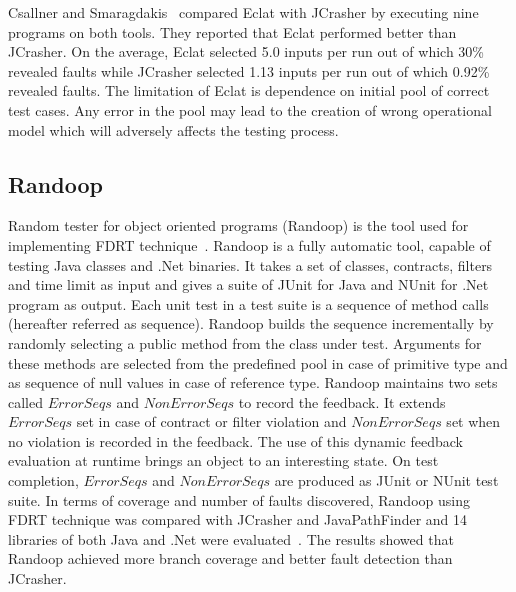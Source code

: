 Csallner and Smaragdakis~\cite{csallner2004jcrasher} compared Eclat with JCrasher by executing nine programs on  both tools. They reported that Eclat performed better than JCrasher. On the average, Eclat selected 5.0 inputs per run out of which 30\% revealed faults while JCrasher selected 1.13 inputs per run out of which 0.92\% revealed faults. The limitation of Eclat is dependence on initial pool of correct test cases. Any error in the pool may lead to the creation of wrong operational model which will adversely affects the testing process.   



\subsection{Randoop}
Random tester for object oriented programs (Randoop) is the tool used for implementing FDRT technique~\cite{pacheco2007randoop}. Randoop is a fully automatic tool, capable of testing Java classes and .Net binaries. It takes a set of classes, contracts, filters and time limit as input and gives a suite of JUnit for Java and NUnit for .Net program as output. Each unit test in a test suite is a sequence of method calls (hereafter referred as sequence). Randoop builds the sequence incrementally by randomly selecting a public method from the class under test.  Arguments for these methods are selected from the predefined pool in case of primitive type and as sequence of null values in case of reference type. Randoop maintains two sets called $ErrorSeqs$ and $NonErrorSeqs$ to record the feedback. It extends $ErrorSeqs$ set in case of contract or filter violation and $NonErrorSeqs$ set when no violation is recorded in the feedback. The use of this dynamic feedback evaluation at runtime brings an object to an interesting state. On test completion, $ErrorSeqs$ and $NonErrorSeqs$ are produced as JUnit or NUnit test suite. In terms of coverage and number of faults discovered, Randoop using FDRT technique was compared with JCrasher and JavaPathFinder and 14 libraries of both Java and .Net were evaluated~\cite{visser2004test}. The results showed that Randoop achieved more branch coverage and better fault detection than JCrasher. 

